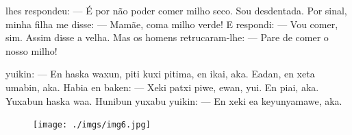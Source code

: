 
 lhes respondeu:\break
--- É por não poder comer milho
seco. Sou desdentada. Por
sinal, minha filha me disse:\break
--- Mamãe, coma milho verde!\break
E respondi:\break
--- Vou comer, sim.
Assim disse a velha. Mas os
homens retrucaram-lhe:\break
--- Pare de comer o nosso milho!

\vspace{2em}

 yuikin:\break
--- En haska waxun, piti kuxi
pitima, en ikai, aka. Eadan,
en xeta umabin, aka.
Habia en baken:\break
--- Xeki patxi piwe, ewan,
yui.\break
En piai, aka. Yuxabun haska waa.
Hunibun yuxabu yuikin:\break
--- En xeki ea keyunyamawe, aka.

\vspace*{\fill}

\pagebreak
\thispagestyle{empty}
\begin{figure}
\vspace*{-2cm}
\hspace*{-2.2cm}\texttt{[image: ./imgs/img6.jpg]}
\end{figure}

\chapter*{}

\mbox{}\vspace*{\fill}


